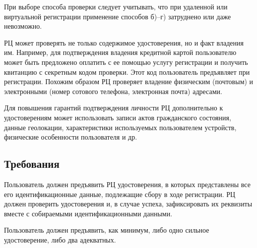 При выборе способа проверки следует учитывать, что при 
удаленной или виртуальной регистрации применение способов б)--г)
затруднено или даже невозможно.

РЦ может проверять не только содержимое удостоверения, но и факт владения 
им. Например, для подтверждения владения кредитной картой пользователю 
может быть предложено оплатить с ее помощью услугу регистрации и 
получить квитанцию с секретным кодом проверки. Этот код пользователь 
предъявляет при регистрации.
%
Похожим образом РЦ проверяет владение физическим (почтовым) 
и электронными (номер сотового телефона, электронная почта) 
адресами.

Для повышения гарантий подтверждения личности РЦ дополнительно к 
удостоверениям может использовать записи актов гражданского состояния, 
данные геолокации, характеристики используемых пользователем устройств, 
физические особенности пользователя и др.
%


\subsection{Требования}\label{IP.Reqs}


Пользователь должен предъявить РЦ удостоверения, в которых 
представлены все его идентификационные данные, подлежащие сбору в 
ходе регистрации. 
%
РЦ должен проверить удостоверения и, в случае успеха, зафиксировать
их реквизиты вместе с собираемыми идентификационными данными.

%

Пользователь должен предъявить, как минимум, либо одно сильное удостоверение,
либо два адекватных.


